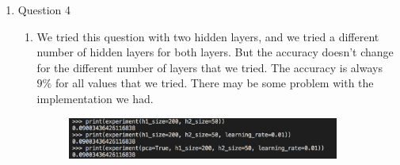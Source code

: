 \documentclass[11pt]{article}
\begin{document}
\begin{enumerate}
\begin{enumerate}
\end{enumerate}

\newpage
\item Question 4
\begin{enumerate}
\item We tried this question with two hidden layers, and we tried a different number of hidden layers for both layers. But the accuracy doesn't change for the different number of layers that we tried. The accuracy is always $9\%$ for all values that we tried. There may be some problem with the implementation we had.
\begin{figure}[h!]
    	\centering
        \includegraphics[width=0.9\textwidth]{q4}
\end{figure}


\end{enumerate}

\end{enumerate}
\end{document}
